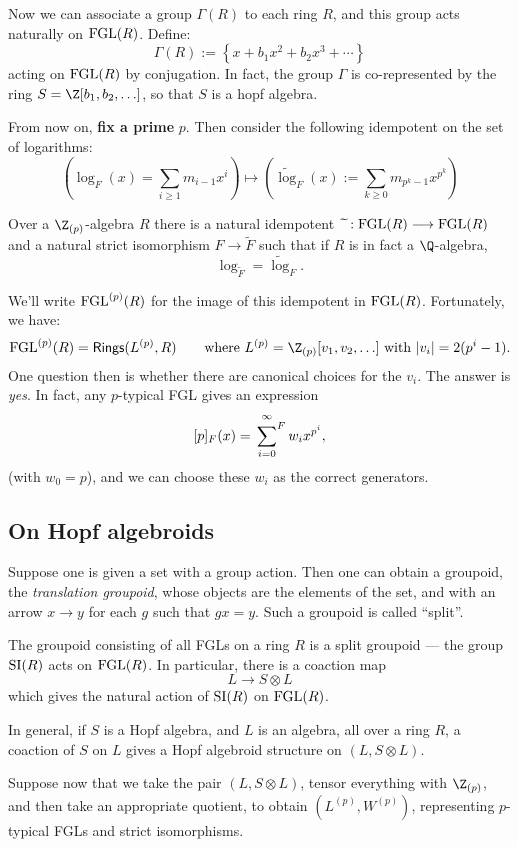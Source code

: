 \documentclass[11pt]{article}
\newcommand\Fsum{\sideset{}{^F}\sum}
\begin{document}
\begin{Formal Group Laws}
\begin{shaded}
Now we can associate a group $\Gamma(R)$ to each ring $R$, and this group acts naturally on $\textup{FGL}(R)$. Define:
\[\Gamma(R):=\left\{x+b_1x^2+b_2x^3+\cdots\right\}\]
acting on $\textup{FGL}(R)$ by conjugation.
 In fact, the group $\Gamma$ is co-represented by the ring $S=\Z[b_1,b_2,\ldots]$, so that $S$ is a hopf algebra.

From now on, \textbf{fix a prime} $p$. Then consider the following idempotent on the set of logarithms:
\[\left(\log_F(x)=\sum_{i\geq1}m_{i-1}x^{i}\right) \mapsto
\left(\widetilde{\log}_F(x):= \sum_{k\geq0}m_{p^k-1}x^{p^k}\right)\]
\begin{thm*}
Over a $\Z_{(p)}$-algebra $R$ there is a natural idempotent\ $\widetilde{\,\,}:\textup{FGL}(R)\longrightarrow\textup{FGL}(R)$ and a natural strict isomorphism $F\to\widetilde{F}$ such that if $R$ is in fact a $\Q$-algebra,
\[\log_{\widetilde{F}}=\widetilde{\log}_F.\]
\end{thm*}
We'll write $\textup{FGL}^{(p)}(R)$ for the image of this idempotent in $\textup{FGL}(R)$. Fortunately, we have:
\[\FGLp(R)=\Rings(L^{(p)},R)\textup{\qquad where }L^{(p)}=\Z_{(p)}[v_1,v_2,\ldots]\textup{ with }|v_i|=2(p^i-1).\]
One question then is whether there are canonical choices for the $v_i$. The answer is \emph{yes}. In fact, any $p$-typical FGL gives an expression
\[[p]_F(x)=\Fsum_{i=0}^{\infty}w_ix^{p^i},\]
(with $w_0=p$), and we can choose these $w_i$ as the correct generators.
\subsection*{On Hopf algebroids}
Suppose one is given a set with a group action. Then one can obtain a groupoid, the \emph{translation groupoid}, whose objects are the elements of the set, and with an arrow $x\to y$ for each $g$ such that $gx=y$. Such a groupoid is called ``split''.

The groupoid consisting of all FGLs on a ring $R$ is a split groupoid --- the group $\textup{SI}(R)$ acts on $\textup{FGL}(R)$. In particular, there is a coaction map
\[L\to S\otimes L\]
which gives the natural action of $\textup{SI}(R)$ on $\textup{FGL}(R)$.

In general, if $S$ is a Hopf algebra, and $L$ is an algebra, all over a ring $R$, a coaction of $S$ on $L$ gives a Hopf algebroid structure on $(L,S\otimes L)$.

Suppose now that we take the pair $(L,S\otimes L)$, tensor everything with $\Z_{(p)}$, and then take an appropriate quotient, to obtain $(L^{(p)},W^{(p)})$, representing $p$-typical FGLs and strict isomorphisms.


\end{shaded}
\end{Formal Group Laws}
\end{document}
